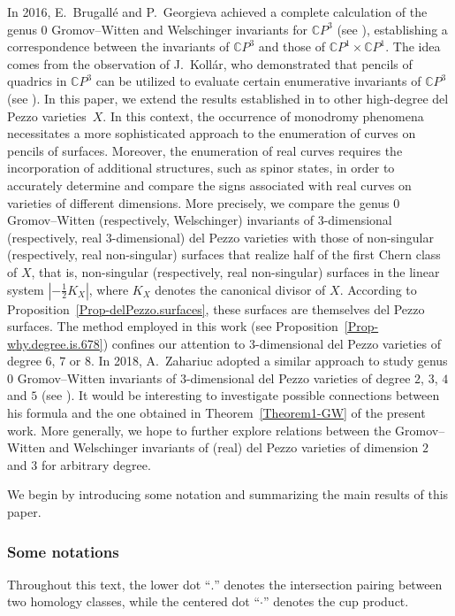 \documentclass[11pt]{amsart}
\numberwithin{equation}{section}
\theoremstyle{definition}
\theoremstyle{plain}
\theoremstyle{remark}
\newcommand{\cpp}{\mathbb{C}P^3}
\begin{document}
In 2016, E.~Brugall\'e and P.~Georgieva achieved a complete calculation of the genus $0$ Gromov--Witten and Welschinger invariants for $\cpp$ (see \cite{brugalle2016pencils}),  establishing a correspondence between the invariants of $\mathbb{C}P^3$ and those of $\mathbb{C}P^1 \times \mathbb{C}P^1$.  The idea comes from the observation of J.~Koll\'ar, who demonstrated that pencils of quadrics in $\mathbb{C}P^3$ can be utilized to evaluate certain enumerative invariants of $\mathbb{C}P^3$ (see \cite{kollar2015examples}). In this paper, we extend the results established in \cite{brugalle2016pencils} to other high-degree del Pezzo varieties~$X$. In this context, the occurrence of monodromy phenomena necessitates a more sophisticated approach to the enumeration of curves on pencils of surfaces. Moreover, the enumeration of real curves requires the incorporation of additional structures, such as spinor states, in order to accurately determine and compare the signs associated with real curves on varieties of different dimensions. More precisely, we compare the genus $0$ Gromov--Witten (respectively, Welschinger) invariants of $3$-dimensional (respectively, real $3$-dimensional)
del Pezzo varieties with those of non-singular (respectively, real non-singular) 
surfaces that realize half of the first Chern class of $X$, that is,  non-singular (respectively, real non-singular) surfaces in the linear system $|-\frac{1}{2}K_X|$, where $K_X$ denotes the canonical divisor of $X$. 
According to Proposition~\ref{Prop-delPezzo.surfaces}, these surfaces are themselves del Pezzo surfaces. 
The method employed in this work  (see Proposition~\ref{Prop-why.degree.is.678}) confines our attention to $3$-dimensional del Pezzo varieties of degree $6$, $7$ or $8$. In 2018,  A.~Zahariuc  adopted a similar approach to study  genus $0$ Gromov--Witten invariants  of $3$-dimensional del Pezzo varieties of degree $2$, $3$, $4$ and $5$ (see \cite{zahariuc2018rational}). It would be interesting to investigate possible connections between his formula and the one obtained in Theorem~\ref{Theorem1-GW}  of the present work. More generally, we hope to further explore relations between the Gromov--Witten and Welschinger invariants of (real) del Pezzo varieties of dimension $2$ and $3$ for arbitrary degree.

We begin by introducing some notation and summarizing the main results of this paper.

\subsubsection*{Some notations}
Throughout this text, the lower dot ``$.$'' denotes the intersection pairing between two homology classes, while the centered dot ``$\cdot$'' denotes the cup product.
\end{document}
